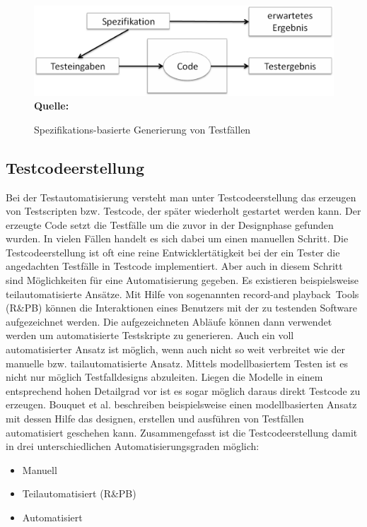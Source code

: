 \begin{figure}[htb]
  \centering  
  \includegraphics[scale=0.6]{img/specBasedDesign.png}\\
  \footnotesize\sffamily\textbf{Quelle:} \cite[vgl. S. 21]{fewster_software_1999}
  \caption{Spezifikations-basierte Generierung von Testfällen}
  \label{fig:specBasedDesign}
\end{figure}

\subsection{Testcodeerstellung}
\label{subsec:testcodeerstellung}
Bei der Testautomatisierung versteht man unter Testcodeerstellung das erzeugen von Testscripten bzw. Testcode, der später wiederholt gestartet werden kann. Der erzeugte Code setzt die Testfälle um die zuvor in der Designphase gefunden wurden.
In vielen Fällen handelt es sich dabei um einen manuellen Schritt. Die Testcodeerstellung ist oft eine reine Entwicklertätigkeit bei der ein Tester die angedachten Testfälle in Testcode implementiert.
Aber auch in diesem Schritt sind Möglichkeiten für eine Automatisierung gegeben.
Es existieren beispielsweise teilautomatisierte Ansätze. Mit Hilfe von sogenannten \grq record-and playback\grq\ Tools (R\&PB) können die Interaktionen eines Benutzers mit der zu testenden Software aufgezeichnet werden. Die aufgezeichneten Abläufe können dann verwendet werden um automatisierte Testskripte zu generieren.
Auch ein voll automatisierter Ansatz ist möglich, wenn auch nicht so weit verbreitet wie der manuelle bzw. tailautomatisierte Ansatz.
Mittels modellbasiertem Testen ist es nicht nur möglich Testfalldesigns abzuleiten. Liegen die Modelle in einem entsprechend hohen Detailgrad vor ist es sogar möglich daraus direkt Testcode zu erzeugen. Bouquet et al. \cite{bouquet_test_2008} beschreiben beispielsweise einen modellbasierten Ansatz mit dessen Hilfe das designen, erstellen und ausführen von Testfällen automatisiert geschehen kann. \cite{amannejad_search-based_2014}
Zusammengefasst ist die Testcodeerstellung damit in drei unterschiedlichen Automatisierungsgraden möglich:
\begin{itemize}
\item Manuell
\item Teilautomatisiert (R\&PB)
\item Automatisiert
\end{itemize}

